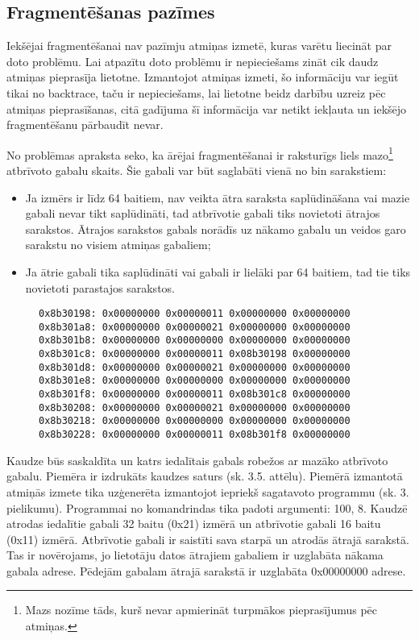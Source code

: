 \subsection{Fragmentēšanas pazīmes}

Iekšējai fragmentēšanai nav pazīmju atmiņas izmetē, kuras varētu liecināt par doto problēmu.
Lai atpazītu doto problēmu ir nepieciešams zināt cik daudz atmiņas pieprasīja lietotne.
Izmantojot atmiņas izmeti, šo informāciju var iegūt tikai no backtrace, taču ir nepieciešams, lai lietotne beidz darbību uzreiz pēc atmiņas pieprasīšanas, citā gadījuma šī informācija var netikt iekļauta un iekšējo fragmentēšanu pārbaudīt nevar.

No problēmas apraksta seko, ka ārējai fragmentēšanai ir raksturīgs liels mazo\footnote{Mazs nozīme tāds, kurš nevar apmierināt turpmākos pieprasījumus pēc atmiņas.} atbrīvoto gabalu skaits.
Šie gabali var būt saglabāti vienā no bin sarakstiem:
\begin{itemize}
\item Ja izmērs ir līdz 64 baitiem, nav veikta ātra saraksta saplūdināšana vai mazie gabali nevar tikt saplūdināti, tad atbrīvotie gabali tiks novietoti ātrajos sarakstos.
Ātrajos sarakstos gabals norādīs uz nākamo gabalu un veidos garo sarakstu no visiem atmiņas gabaliem;
\item Ja ātrie gabali tika saplūdināti vai gabali ir lielāki par 64 baitiem, tad tie tiks novietoti parastajos sarakstos.
\end{itemize}
\begin{figure}[h]
\begin{lstlisting}[style=customgdb]
0x8b30198: 0x00000000 0x00000011 0x00000000 0x00000000
0x8b301a8: 0x00000000 0x00000021 0x00000000 0x00000000
0x8b301b8: 0x00000000 0x00000000 0x00000000 0x00000000
0x8b301c8: 0x00000000 0x00000011 0x08b30198 0x00000000
0x8b301d8: 0x00000000 0x00000021 0x00000000 0x00000000
0x8b301e8: 0x00000000 0x00000000 0x00000000 0x00000000
0x8b301f8: 0x00000000 0x00000011 0x08b301c8 0x00000000
0x8b30208: 0x00000000 0x00000021 0x00000000 0x00000000
0x8b30218: 0x00000000 0x00000000 0x00000000 0x00000000
0x8b30228: 0x00000000 0x00000011 0x08b301f8 0x00000000
\end{lstlisting}
\caption{\textbf{\fontsize{11}{12}\selectfont {Fragmentētā kaudze}}}
\end{figure}

Kaudze būs saskaldīta un katrs iedalītais gabals robežos ar mazāko atbrīvoto gabalu.
Piemēra ir izdrukāts kaudzes saturs (sk. 3.5. attēlu).
Piemērā izmantotā atmiņās izmete tika uzģenerēta izmantojot iepriekš sagatavoto programmu (sk. 3. pielikumu).
Programmai no komandrindas tika padoti argumenti: 100, 8.
Kaudzē atrodas iedalītie gabali 32 baitu (0x21) izmērā un atbrīvotie gabali 16 baitu (0x11) izmērā.
Atbrīvotie gabali ir saistīti sava starpā un atrodās ātrajā sarakstā.
Tas ir novērojams, jo lietotāju datos ātrajiem gabaliem ir uzglabāta nākama gabala adrese.
Pēdejām gabalam ātrajā sarakstā ir uzglabāta 0x00000000 adrese.



